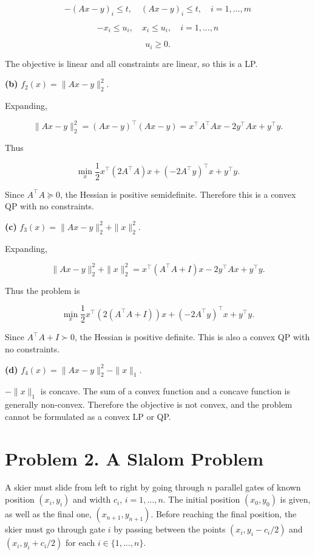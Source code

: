 \documentclass[
	12pt,
]{fphw}
\begin{document}
\[
-(Ax-y)_i \le t,\quad (Ax-y)_i \le t, \quad i=1,\dots,m
\]

\[
-x_i \le u_i,\quad x_i \le u_i, \quad i=1,\dots,n
\]

\[
u_i \ge 0.
\]

The objective is linear and all constraints are linear, so this is a LP.

\vspace{0.5em}

\textbf{(b)} \(f_2(x) = \|Ax-y\|_2^2.\)

Expanding,

\[
\|Ax-y\|_2^2 = (Ax-y)^\top(Ax-y)
= x^\top A^\top A x - 2y^\top A x + y^\top y.
\]

Thus

\[
\min_x \frac{1}{2}x^\top (2A^\top A)x + (-2A^\top y)^\top x + y^\top y.
\]

Since \(A^\top A \succeq 0\), the Hessian is positive semidefinite. Therefore this is a convex QP with no constraints.

\vspace{0.5em}

\textbf{(c)} \(f_3(x) = \|Ax-y\|_2^2 + \|x\|_2^2.\)

Expanding,

\[
\|Ax-y\|_2^2 + \|x\|_2^2
= x^\top(A^\top A + I)x -2y^\top A x + y^\top y.
\]

Thus the problem is

\[
\min_x \frac{1}{2}x^\top (2(A^\top A + I))x + (-2A^\top y)^\top x + y^\top y.
\]

Since \(A^\top A + I \succ 0\), the Hessian is positive definite. This is also a convex QP with no constraints.

\vspace{0.5em}

\textbf{(d)} \(f_4(x) = \|Ax-y\|_2^2 - \|x\|_1.\)

\(-\|x\|_1\) is concave. The sum of a convex function and a concave function is generally non-convex. Therefore the objective is not convex, and the problem cannot be formulated as a convex LP or QP.

\newpage
\section*{Problem 2. A Slalom Problem}

A skier must slide from left to right by going through \(n\) parallel gates of known position \((x_i, y_i)\) and width \(c_i\), \(i = 1, \ldots, n\). The initial position \((x_0, y_0)\) is given, as well as the final one, \((x_{n+1}, y_{n+1})\). Before reaching the final position, the skier must go through gate \(i\) by passing between the points \((x_i, y_i - c_i/2)\) and \((x_i, y_i + c_i/2)\) for each \(i \in \{1, \ldots, n\}\).
\end{document}
